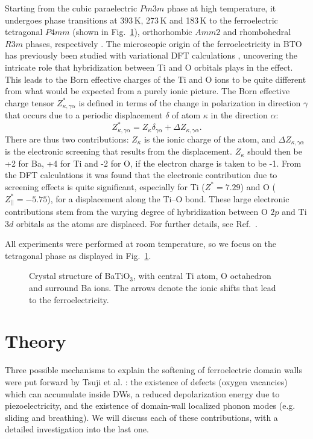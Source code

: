 Starting from the cubic paraelectric $Pm3m$ phase at high temperature, it undergoes phase transitions at 393\,K, 273\,K and 183\,K to the ferroelectric tetragonal $P4mm$ (shown in Fig.~\ref{fig:BTO_crystal}), orthorhombic $Amm2$ and rhombohedral $R3m$ phases, respectively \cite{Mason1948, VonHippel1950, Marton2010}.
The microscopic origin of the ferroelectricity in BTO has previously been studied with variational DFT calculations \cite{Ghosez1995}, uncovering the intricate role that hybridization between Ti and O orbitals plays in the effect.
This leads to the Born effective charges of the Ti and O ions to be quite different from what would be expected from a purely ionic picture.
The Born effective charge tensor $Z^*_{\kappa, \gamma\alpha}$ is defined in terms of the change in polarization in direction $\gamma$ that occurs due to a periodic displacement $\delta$ of atom $\kappa$ in the direction $\alpha$:
\begin{equation}
Z^*_{\kappa, \gamma\alpha} = Z_{\kappa} \delta_{\gamma\alpha} + \Delta Z_{\kappa, \gamma\alpha}.
\end{equation}
There are thus two contributions: $Z_{\kappa}$ is the ionic charge of the atom, and $\Delta Z_{\kappa, \gamma\alpha}$ is the electronic screening that results from the displacement.
$Z_{\kappa}$ should then be +2 for Ba, +4 for Ti and -2 for O, if the electron charge is taken to be -1.
From the DFT calculations it was found that the electronic contribution due to screening effects is quite significant, especially for Ti ($Z^* = 7.29$) and O ($Z^*_{||} = -5.75$), for a displacement along the Ti--O bond.
These large electronic contributions stem from the varying degree of hybridization between O $2p$ and Ti $3d$ orbitals as the atoms are displaced.
For further details, see Ref.~\cite{Ghosez1995}.

All experiments were performed at room temperature, so we focus on the tetragonal phase as displayed in Fig.~\ref{fig:BTO_crystal}.
\begin{figure}[h]
	\caption{\label{fig:BTO_crystal} Crystal structure of BaTiO$_3$, with central Ti atom, O octahedron and surround Ba ions. The arrows denote the ionic shifts that lead to the ferroelectricity.}
\end{figure}

\section{Theory}
Three possible mechanisms to explain the softening of ferroelectric domain walls were put forward by Tsuji et al. \cite{Tsuji2005}: the existence of defects (oxygen vacancies) which can accumulate inside DWs, a reduced depolarization energy due to piezoelectricity, and the existence of domain-wall localized phonon modes (e.g. sliding and breathing). We will discuss each of these contributions, with a detailed investigation into the last one.

